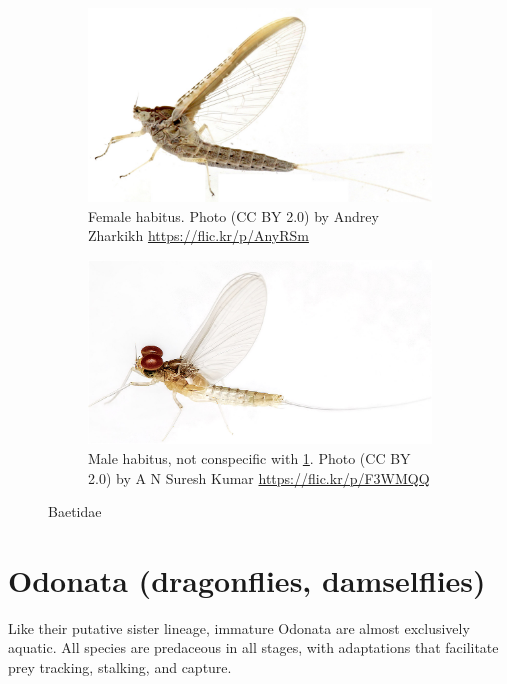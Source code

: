 \documentclass[letterpaper, 11pt]{article}
\begin{document}
\begin{figure}[ht!]
    \centering
    \begin{subfigure}[ht!]{0.45\textwidth}
        \includegraphics[width=\textwidth]{BaetidaeFemHabitus}
        \caption{Female habitus. Photo (CC BY 2.0) by Andrey Zharkikh \url{https://flic.kr/p/AnyRSm}}
        \label{fig:baetid1}
    \end{subfigure}
    \hfill
    \begin{subfigure}[ht!]{0.45\textwidth}
        \includegraphics[width=\textwidth]{BaetidaeMaleHabitus}
        \caption{Male habitus, not conspecific with \ref{fig:baetid1}. Photo (CC BY 2.0) by A N Suresh Kumar \url{https://flic.kr/p/F3WMQQ}}
        \label{fig:baetid2}
    \end{subfigure}
    \caption{Baetidae}\label{fig:baetids}
\end{figure}

\FloatBarrier

\section{Odonata (dragonflies, damselflies)}%
Like their putative sister lineage, immature Odonata are almost exclusively aquatic. All species are predaceous in all stages, with adaptations that facilitate prey tracking, stalking, and capture. \\
\end{document}
